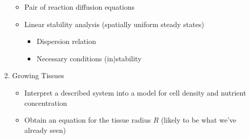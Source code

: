 \documentclass{X:/Documents/Coding/Latex/myassignment}
\begin{document}
\begin{enumerate}
	\begin{itemize}
		\item Pair of reaction diffusion equations
		\item Linear stability analysis (spatially uniform steady states)
		\begin{itemize}
			\item Dispersion relation
			\item Necessary conditions (in)stability
		\end{itemize}
	\end{itemize}
	\item Growing Tissues 
	\begin{itemize}
		\item Interpret a described system into a model for cell density and nutrient concentration
		\item Obtain an equation for the tissue radius $R$ (likely to be what we've already seen)
	\end{itemize}
\end{enumerate}
\end{document}
